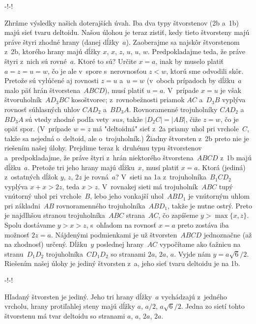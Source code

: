 {\midinsert
\centerline{\inspicture-!\hss\inspicture-!}
\endinsert

Zhrňme výsledky našich doterajších úvah. Iba dva typy štvorstenov
(\obrr2b{} a~\obrrnum1b) majú sieť tvaru deltoidu. Našou úlohou je
teraz zistiť, kedy tieto štvorsteny majú práve štyri zhodné hrany
(danej dĺžky~$a$). Zaoberajme sa najskôr štvorstenom z~\obrr2b,
ktorého hrany majú dĺžky $x$, $x$, $z$, $u$, $u$, $w$.
Predpokladajme teda, že práve štyri z~nich sú rovné~$a$. Ktoré
to sú? Určite $x=a$, inak by muselo platiť
$a=z=u=w$, čo je ale v~spore s~nerovnosťou $z<w$, ktorú sme odvodili
skôr. Pretože sú vylúčené aj rovnosti $z=u$ a~$u=w$ (v~oboch
prípadoch by dĺžku~$a$ malo päť hrán štvorstena~$ABCD$),
musí platiť $u=a$. V~prípade $x=u$ je však štvoruholník~$AD_3BC$
kosoštvorec; z~rovnobežnosti priamok $AC$ a~$D_3B$ vyplýva rovnosť
súhlasných uhlov $CAD_2$ a~$BD_3A$. Rovnoramenné trojuholníky
$CAD_2$ a~$BD_3A$ sú vtedy zhodné podľa vety~$sus$, takže
$|D_2C|=|AB|$, čiže $z=w$, čo je opäť spor. (V~prípade
$w=z$ má "deltoidná" sieť z~\obrr2a{} priamy uhol pri vrchole~$C$,
takže sa nejedná o~deltoid, ale o~trojuholník.) Žiadny štvorsten
z~\obrr2b{} preto nie je riešením našej úlohy.
Prejdime teraz k~druhému typu štvorstenov a~predpokladajme, že práve
štyri z~hrán niektorého štvorstena~$ABCD$ z~\obrr1b{} majú dĺžku~$a$.
Pretože tri jeho hrany majú dĺžku~$x$, musí platiť $x=a$. Ktorá
(jediná) z~ostatných dĺžok $y$, $z$, $2z$ je rovná~$a$? V~sieti na
\obrr1a{} z~trojuholníka~$B_1CD_2$ vyplýva $x+x>2z$, teda $x>z$.
V~rovnakej sieti má trojuholník~$ABC$ tupý vnútorný uhol pri vrchole~$B$,
lebo jeho vonkajší uhol~$ABD_1$ je vnútorným uhlom pri základni~$AB$
rovnoramenného trojuholníka~$ABD_1$, takže je nutne ostrý.
Preto je najdlhšou stranou trojuholníka~$ABC$ strana~$AC$, čo
zapíšeme $y>\max\{x,z\}$. Spolu dostávame $y>x>z$,
s~ohľadom na rovnosť $x=a$ preto zostáva iba možnosť $2z=a$.
Nájdenými podmienkami je už štvorsten~$ABCD$ jednoznačne (až na
zhodnosť) určený. Dĺžku~$y$ poslednej hrany~$AC$ vypočítame ako
ťažnicu na stranu~$D_1D_2$ trojuholníka~$CD_1D_2$ so stranami $2a$,
$2a$, $a$. Vyjde nám $y=a\sqrt6/2$. Riešením našej úlohy
je jediný štvorsten z~\obr a, jeho sieť tvaru deltoidu je na
\obrr1b.

\midinsert
\centerline{\inspicture-!\hss\inspicture-!}
\endinsert

\odpoved
Hľadaný štvorsten je jediný. Jeho tri hrany dĺžky~$a$
vychádzajú z~jedného vrcholu, hrany protiľahlej steny majú
dĺžky $a$, $a/2$, $a\sqrt6/2$. Jedna zo sietí tohto
štvorstenu má tvar deltoidu so stranami $a$, $a$, $2a$,
$2a$.}

